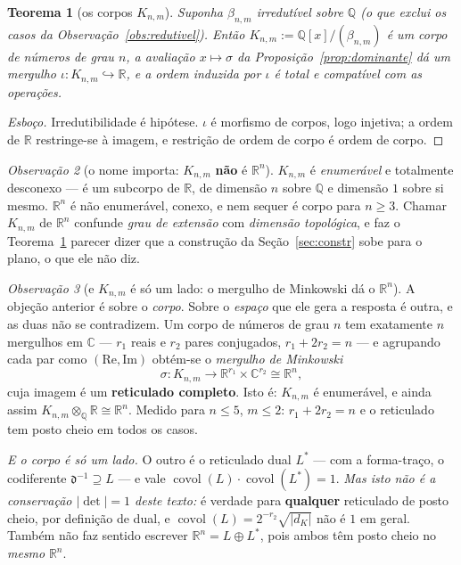 \documentclass[11pt,a4paper]{article}
\theoremstyle{plain}
\newtheorem{teorema}{Teorema}[section]
\theoremstyle{definition}
\theoremstyle{remark}
\newtheorem{obs}[teorema]{Observação}
\newcommand{\R}{\mathbb{R}}
\newcommand{\C}{\mathbb{C}}
\newcommand{\Q}{\mathbb{Q}}
\begin{document}
\begin{teorema}[os corpos $K_{n,m}$]\label{thm:constrn}
Suponha $\beta_{n,m}$ irredutível sobre $\Q$ (o que exclui os casos da
Observação~\ref{obs:redutivel}). Então $K_{n,m} := \Q[x]/(\beta_{n,m})$ é um corpo de números de
grau $n$, a avaliação $x\mapsto\sigma$ da Proposição~\ref{prop:dominante} dá um mergulho
$\iota: K_{n,m}\hookrightarrow\R$, e a ordem induzida por $\iota$ é total e compatível com as
operações.
\end{teorema}

\begin{proof}[Esboço]
Irredutibilidade é hipótese. $\iota$ é morfismo de corpos, logo injetiva; a ordem de $\R$
restringe-se à imagem, e restrição de ordem de corpo é ordem de corpo.
\end{proof}

\begin{obs}[o nome importa: $K_{n,m}$ \textbf{não} é $\R^n$]\label{obs:naoRn}
$K_{n,m}$ é \emph{enumerável} e totalmente desconexo --- é um subcorpo de $\R$, de dimensão $n$
sobre $\Q$ e dimensão $1$ sobre si mesmo. $\R^n$ é não enumerável, conexo, e nem sequer é corpo
para $n\geq3$. Chamar $K_{n,m}$ de $\R^n$ confunde \emph{grau de extensão} com \emph{dimensão
topológica}, e faz o Teorema~\ref{thm:constrn} parecer dizer que a construção da Seção~\ref{sec:constr} sobe para
o plano, o que ele não diz.
\end{obs}

\begin{obs}[e $K_{n,m}$ é só um lado: o mergulho de Minkowski dá o $\R^n$]\label{obs:mink}
A objeção anterior é sobre o \emph{corpo}. Sobre o \emph{espaço} que ele gera a resposta é outra, e
as duas não se contradizem. Um corpo de números de grau $n$ tem exatamente $n$ mergulhos em $\C$ ---
$r_1$ reais e $r_2$ pares conjugados, $r_1 + 2r_2 = n$ --- e agrupando cada par como
$(\mathrm{Re},\mathrm{Im})$ obtém-se o \emph{mergulho de Minkowski}
\[
  \sigma : K_{n,m} \longrightarrow \R^{r_1}\times\C^{r_2} \cong \R^n ,
\]
cuja imagem é um \textbf{reticulado completo}. Isto é: $K_{n,m}$ é enumerável, e ainda assim
$K_{n,m}\otimes_\Q\R \cong \R^n$. Medido para $n\leq5$, $m\leq2$: $r_1+2r_2 = n$ e o reticulado tem
posto cheio em todos os casos.

\emph{E o corpo é só um lado.} O outro é o reticulado dual $L^{*}$ --- com a forma-traço, o
codiferente $\mathfrak d^{-1} \supseteq L$ --- e vale
$\operatorname{covol}(L)\cdot\operatorname{covol}(L^{*}) = 1$. \emph{Mas isto não é a conservação
$|\det| = 1$ deste texto:} é verdade para \textbf{qualquer} reticulado de posto cheio, por
definição de dual, e $\operatorname{covol}(L) = 2^{-r_2}\sqrt{|d_K|}$ não é $1$ em geral. Também
não faz sentido escrever $\R^n = L\oplus L^{*}$, pois ambos têm posto cheio no \emph{mesmo}
$\R^n$.
\end{obs}
\end{document}
